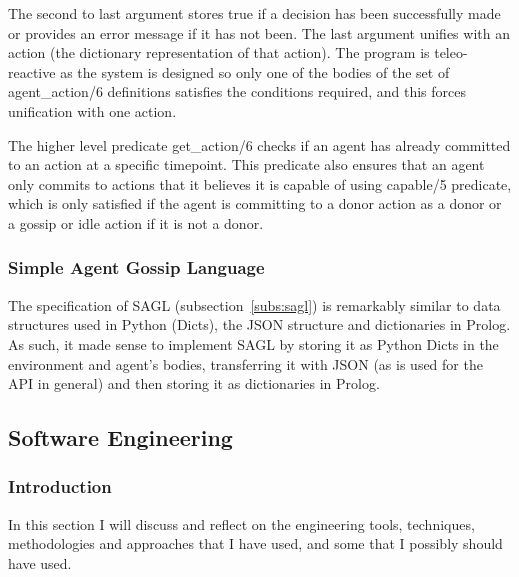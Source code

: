 \documentclass[]{final_report}
\begin{document}
The second to last argument stores true if a decision has been successfully made or provides an error message if it has not been. The last argument unifies with an action (the dictionary representation of that action). The program is teleo-reactive as the system is designed so only one of the bodies of the set of agent\_action/6 definitions satisfies the conditions required, and this forces unification with one action.\par 
The higher level predicate get\_action/6 checks if an agent has already committed to an action at a specific timepoint. This predicate also ensures that an agent only commits to actions that it believes it is capable of using capable/5 predicate, which is only satisfied if the agent is committing to a donor action as a donor or a gossip or idle action if it is not a donor.

\subsubsection{Simple Agent Gossip Language}
The specification of SAGL (subsection~\ref{subs:sagl}) is remarkably similar to data structures used in Python (Dicts), the JSON structure and dictionaries in Prolog. As such, it made sense to implement SAGL by storing it as Python Dicts in the environment and agent's bodies, transferring it with JSON (as is used for the API in general) and then storing it as dictionaries in Prolog. 

\subsection{Software Engineering}
\subsubsection{Introduction}
In this section I will discuss and reflect on the engineering tools, techniques, methodologies and approaches that I have used, and some that I possibly should have used.
\end{document}
